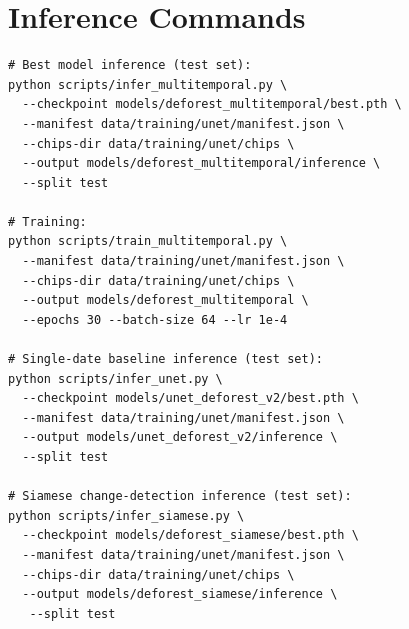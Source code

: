 \documentclass[twocolumn]{article}
\begin{document}
\section{Inference Commands}
\label{app:inference}
\begin{verbatim}
# Best model inference (test set):
python scripts/infer_multitemporal.py \
  --checkpoint models/deforest_multitemporal/best.pth \
  --manifest data/training/unet/manifest.json \
  --chips-dir data/training/unet/chips \
  --output models/deforest_multitemporal/inference \
  --split test

# Training:
python scripts/train_multitemporal.py \
  --manifest data/training/unet/manifest.json \
  --chips-dir data/training/unet/chips \
  --output models/deforest_multitemporal \
  --epochs 30 --batch-size 64 --lr 1e-4

# Single-date baseline inference (test set):
python scripts/infer_unet.py \
  --checkpoint models/unet_deforest_v2/best.pth \
  --manifest data/training/unet/manifest.json \
  --output models/unet_deforest_v2/inference \
  --split test

# Siamese change-detection inference (test set):
python scripts/infer_siamese.py \
  --checkpoint models/deforest_siamese/best.pth \
  --manifest data/training/unet/manifest.json \
  --chips-dir data/training/unet/chips \
  --output models/deforest_siamese/inference \
   --split test
\end{verbatim}



\end{document}

